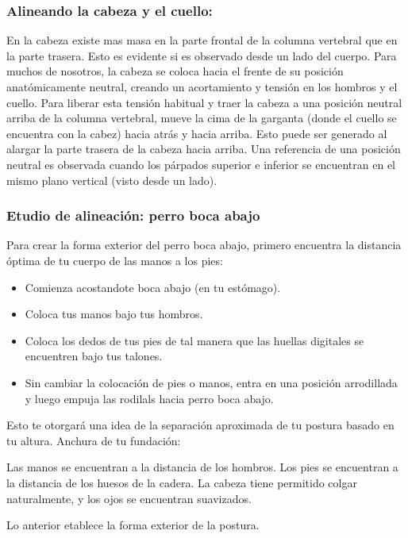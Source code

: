 \subsubsection{Alineando la cabeza y el cuello:}
En la cabeza existe mas masa en la parte frontal de la columna vertebral que en la parte trasera. Esto es evidente si es observado desde un lado del cuerpo. Para muchos de nosotros, la cabeza se coloca hacia el frente de su posición anatómicamente neutral, creando un acortamiento y tensión en los hombros y el cuello. Para liberar esta tensión habitual y traer la cabeza a una posición neutral arriba de la columna vertebral, mueve la cima de la garganta (donde el cuello se encuentra con la cabez) hacia atrás y hacia arriba. Esto puede ser generado al alargar la parte trasera de la cabeza hacia arriba. Una referencia de una posición neutral es observada cuando los párpados superior e inferior  se encuentran en el mismo plano vertical (visto desde un lado).

\subsubsection{Etudio de alineación: perro boca abajo}
Para crear la forma exterior del perro boca abajo, primero encuentra la distancia óptima de tu cuerpo de las manos a los pies:
\begin{itemize}
	\item Comienza acostandote boca abajo (en tu estómago).
	\item Coloca tus manos bajo tus hombros.
	\item Coloca los dedos de tus pies de tal manera que las huellas digitales se encuentren bajo tus talones.
	\item Sin cambiar la colocación de pies o manos, entra en una posición arrodillada y luego empuja las rodilals hacia perro boca abajo.
\end{itemize}

Esto te otorgará una idea de la separación aproximada de tu postura basado en tu altura. Anchura de tu fundación:
\begin{itemize}
	\itemize Las manos se encuentran a la distancia de los hombros.
	\itemize Los pies se encuentran a la distancia de los huesos de la cadera.
	\itemize La cabeza tiene permitido colgar naturalmente, y los ojos se encuentran suavizados.

Lo anterior etablece la forma exterior de la postura.
\end{itemize}

